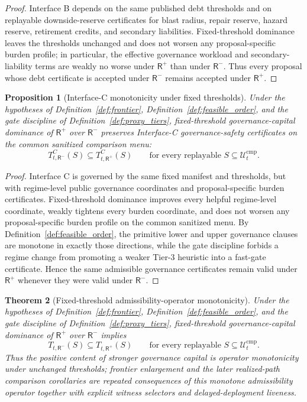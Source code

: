 \documentclass[11pt]{article}
\newtheorem{theorem}{Theorem}[section]
\newtheorem{proposition}[theorem]{Proposition}
\theoremstyle{definition}
\newcommand{\1}{\mathbf{1}}
\begin{document}
\begin{proof}
Interface B depends on the same published debt thresholds and on replayable downside-reserve certificates for blast radius, repair reserve, hazard reserve, retirement credits, and secondary liabilities. Fixed-threshold dominance leaves the thresholds unchanged and does not worsen any proposal-specific burden profile; in particular, the effective governance workload and secondary-liability terms are weakly no worse under $\mathsf R^+$ than under $\mathsf R^-$. Thus every proposal whose debt certificate is accepted under $\mathsf R^-$ remains accepted under $\mathsf R^+$.
\end{proof}

\begin{proposition}[Interface-C monotonicity under fixed thresholds]\label{prop:mono_gov}
Under the hypotheses of Definition~\ref{def:frontier}, Definition~\ref{def:feasible_order}, and the gate discipline of Definition~\ref{def:proxy_tiers}, fixed-threshold governance-capital dominance of $\mathsf R^+$ over $\mathsf R^-$ preserves Interface-C governance-safety certificates on the common sanitized comparison menu:
\[
T^{C}_{t,\mathsf R^-}(S)\subseteq T^{C}_{t,\mathsf R^+}(S)
\qquad\text{for every replayable }S\subseteq\mathcal U_t^{\mathrm{cmp}}.
\]
\end{proposition}

\begin{proof}
Interface C is governed by the same fixed manifest and thresholds, but with regime-level public governance coordinates and proposal-specific burden certificates. Fixed-threshold dominance improves every helpful regime-level coordinate, weakly tightens every burden coordinate, and does not worsen any proposal-specific burden profile on the common sanitized menu. By Definition~\ref{def:feasible_order}, the primitive lower and upper governance clauses are monotone in exactly those directions, while the gate discipline forbids a regime change from promoting a weaker Tier-3 heuristic into a fast-gate certificate. Hence the same admissible governance certificates remain valid under $\mathsf R^+$ whenever they were valid under $\mathsf R^-$.
\end{proof}

\begin{theorem}[Fixed-threshold admissibility-operator monotonicity]\label{thm:operator_monotone}
Under the hypotheses of Definition~\ref{def:frontier}, Definition~\ref{def:feasible_order}, and the gate discipline of Definition~\ref{def:proxy_tiers}, fixed-threshold governance-capital dominance of $\mathsf R^+$ over $\mathsf R^-$ implies
\[
T_{t,\mathsf R^-}(S)\subseteq T_{t,\mathsf R^+}(S)
\qquad\text{for every replayable }S\subseteq \mathcal U_t^{\mathrm{cmp}}.
\]
Thus the positive content of stronger governance capital is operator monotonicity under unchanged thresholds; frontier enlargement and the later realized-path comparison corollaries are repeated consequences of this monotone admissibility operator together with explicit witness selectors and delayed-deployment liveness.
\end{theorem}
\end{document}
